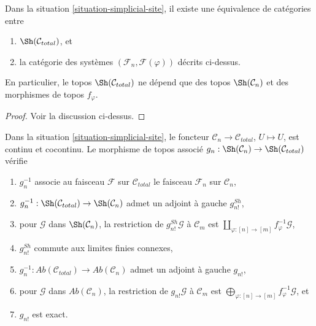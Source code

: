 \begin{lemma}
\label{lemma-describe-sheaves-simplicial-site-site}
Dans la situation \ref{situation-simplicial-site}, il existe une équivalence de
catégories entre
\begin{enumerate}
\item $\Sh(\mathcal{C}_{total})$, et
\item la catégorie des systèmes $(\mathcal{F}_n, \mathcal{F}(\varphi))$
décrits ci-dessus.
\end{enumerate}
En particulier, le topos $\Sh(\mathcal{C}_{total})$ ne dépend que des
topos $\Sh(\mathcal{C}_n)$ et des morphismes de topos $f_\varphi$.
\end{lemma}

\begin{proof}
Voir la discussion ci-dessus.
\end{proof}

\begin{lemma}
\label{lemma-restriction-to-components-site}
Dans la situation \ref{situation-simplicial-site}, le foncteur
$\mathcal{C}_n \to \mathcal{C}_{total}$, $U \mapsto U$, est continu
et cocontinu. Le morphisme de
topos associé $g_n : \Sh(\mathcal{C}_n) \to \Sh(\mathcal{C}_{total})$ vérifie
\begin{enumerate}
\item $g_n^{-1}$ associe au faisceau $\mathcal{F}$ sur $\mathcal{C}_{total}$
le faisceau $\mathcal{F}_n$ sur $\mathcal{C}_n$,
\item $g_n^{-1} : \Sh(\mathcal{C}_{total}) \to \Sh(\mathcal{C}_n)$
admet un adjoint à gauche $g^{Sh}_{n!}$,
\item pour $\mathcal{G}$ dans $\Sh(\mathcal{C}_n)$, la restriction de
$g_{n!}^{Sh}\mathcal{G}$ à $\mathcal{C}_m$ est
$\coprod\nolimits_{\varphi : [n] \to [m]} f_\varphi^{-1}\mathcal{G}$,
\item $g_{n!}^{Sh}$ commute aux limites finies connexes,
\item $g_n^{-1} : \textit{Ab}(\mathcal{C}_{total}) \to
\textit{Ab}(\mathcal{C}_n)$ admet un adjoint à gauche $g_{n!}$,
\item pour $\mathcal{G}$ dans $\textit{Ab}(\mathcal{C}_n)$, la restriction de
$g_{n!}\mathcal{G}$ à $\mathcal{C}_m$ est
$\bigoplus\nolimits_{\varphi : [n] \to [m]} f_\varphi^{-1}\mathcal{G}$, et
\item $g_{n!}$ est exact.
\end{enumerate}
\end{lemma}

